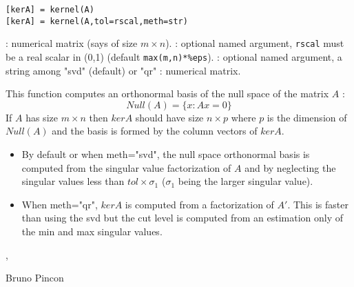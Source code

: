 
\begin{mandesc}
\end{mandesc}

\begin{calling_sequence}
\begin{verbatim}
[kerA] = kernel(A) 
[kerA] = kernel(A,tol=rscal,meth=str) 
\end{verbatim}
\end{calling_sequence}
\begin{parameters}
  \begin{varlist}
     :  numerical matrix (says of size $m \times n$).
     : optional named argument, \verb+rscal+ must be  a real scalar in (0,1) (default \verb+max(m,n)*%eps+).
     : optional named argument, a string among "svd" (default) or "qr"
     : numerical matrix.
  \end{varlist}
\end{parameters}

\begin{mandescription}
This function computes an orthonormal basis of the null space of the
matrix $A$ :
$$
    Null(A) = \{ x : Ax = 0 \} 
$$
 If $A$ has size $m \times n$ then $kerA$ should have 
size $n \times p$ where $p$ is the dimension of  $Null(A)$ 
and the basis is formed by the column vectors of $kerA$. 
\begin{itemize}
\item By default or when  meth="svd", the null space orthonormal basis 
is computed from the singular value factorization of $A$ and by 
neglecting the singular values less than $tol \times \sigma_1$
($\sigma_1$ being the larger singular value). 
\item When  meth="qr", $kerA$ is computed from a  
factorization of $A'$. This is faster than using the svd but 
the cut level is computed from an estimation only of the min 
and max singular values.
\end{itemize}
\end{mandescription}

\begin{examples}
  \begin{program}
  \end{program}
\end{examples}

\begin{manseealso}
  , 
\end{manseealso}

\begin{authors}
   Bruno Pincon
\end{authors}
